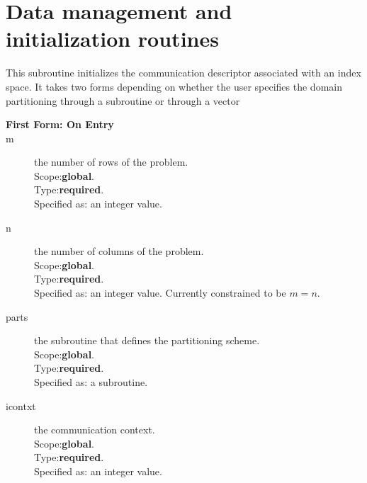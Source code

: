 \section{Data management and initialization routines}
\label{sec:toolsrout}


%
%


This subroutine initializes the communication descriptor associated
with an index space. It takes two forms depending on whether the user
specifies the domain partitioning through a subroutine or through a vector
\begin{description}
\item[\bf  First Form: On Entry ]
\item[m] the number of rows of the problem.\\
Scope:{\bf global}.\\
Type:{\bf required}.\\
Specified as: an integer value.
\item[n] the number of columns of the problem.\\
Scope:{\bf global}.\\
Type:{\bf required}.\\
Specified as: an integer value. Currently constrained to be  $m=n$.
\item[parts] the subroutine that defines the partitioning scheme.\\
Scope:{\bf global}.\\
Type:{\bf required}.\\
Specified as: a subroutine. 
\item[icontxt] the communication context.\\
Scope:{\bf global}.\\
Type:{\bf required}.\\
Specified as: an integer value.
\end{description}
